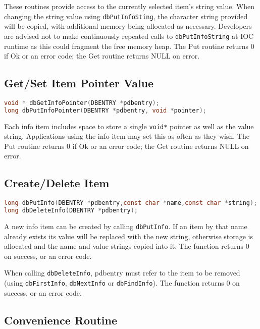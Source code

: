 These routines provide access to the currently selected item's string value.
When changing the string value using \verb|dbPutInfoSting|, the character string provided will be copied, with additional memory being allocated as necessary.
Developers are advised not to make continuously repeated calls to \verb|dbPutInfoString| at IOC runtime as this could fragment 
the free memory heap.
The Put routine returns 0 if Ok or an error code; the Get routine returns NULL on error.

\subsection{Get/Set Item Pointer Value}

\begin{lstlisting}[language=C]
void * dbGetInfoPointer(DBENTRY *pdbentry);
long dbPutInfoPointer(DBENTRY *pdbentry, void *pointer);
\end{lstlisting}

Each info item includes space to store a single \verb|void*| pointer as well as the value string.
Applications using the info item may set this as often as they wish.
The Put routine returns 0 if Ok or an error code; the Get routine returns NULL on error.

\subsection{Create/Delete Item}

\begin{lstlisting}[language=C]
long dbPutInfo(DBENTRY *pdbentry,const char *name,const char *string);
long dbDeleteInfo(DBENTRY *pdbentry);
\end{lstlisting}

A new info item can be created by calling \verb|dbPutInfo|.
If an item by that name already exists its value will be replaced with the new string, otherwise storage is allocated and the name and value strings copied into it.
The function returns 0 on success, or an error code.

When calling \verb|dbDeleteInfo|, pdbentry must refer to the item to be removed (using \verb|dbFirstInfo|, \verb|dbNextInfo| or \verb|dbFindInfo|).
The function returns 0 on success, or an error code.

\subsection{Convenience Routine}

